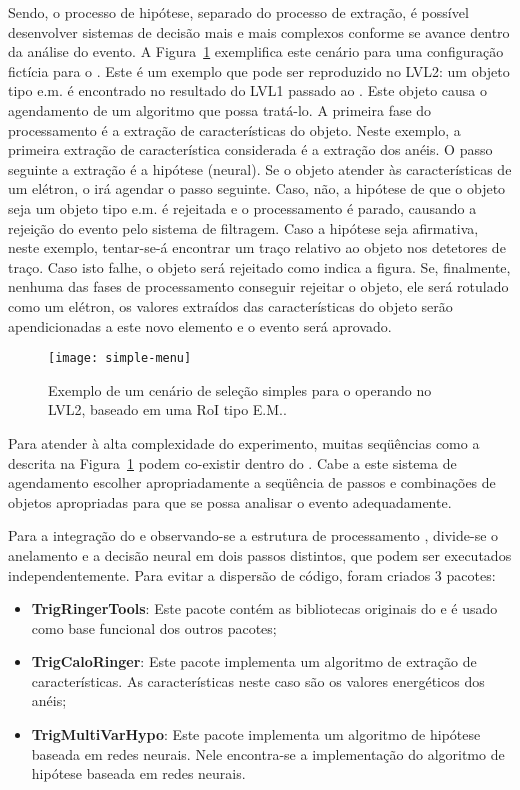 Sendo, o processo de hipótese, separado do processo de extração, é possível
desenvolver sistemas de decisão mais e mais complexos conforme se avance
dentro da análise do evento. A Figura~\ref{fig:simple-menu} exemplifica este
cenário para uma configuração fictícia para o . Este é um
exemplo que pode ser reproduzido no LVL2: um objeto tipo e.m. é encontrado no
resultado do LVL1 passado ao . Este objeto causa o agendamento
de um algoritmo que possa tratá-lo. A primeira fase do processamento é a
extração de características do objeto. Neste exemplo, a primeira extração de
característica considerada é a extração dos anéis. O passo seguinte a extração
é a hipótese (neural). Se o objeto atender às características de um elétron, o
 irá agendar o passo seguinte. Caso, não, a hipótese de que o
objeto seja um objeto tipo e.m. é rejeitada e o processamento é parado,
causando a rejeição do evento pelo sistema de filtragem. Caso a hipótese seja
afirmativa, neste exemplo, tentar-se-á encontrar um traço relativo ao objeto
nos detetores de traço. Caso isto falhe, o objeto será rejeitado como indica a
figura. Se, finalmente, nenhuma das fases de processamento conseguir rejeitar
o objeto, ele será rotulado como um elétron, os valores extraídos das
características do objeto serão apendicionadas a este novo elemento e o evento
será aprovado.

\begin{figure}
\begin{center}
\texttt{[image: simple-menu]}
\end{center}
\caption{Exemplo de um cenário de seleção simples para o 
operando no LVL2, baseado em uma RoI tipo E.M..}
\label{fig:simple-menu}
\end{figure}

Para atender à alta complexidade do experimento, muitas seqüências como a
descrita na Figura~\ref{fig:simple-menu} podem co-existir dentro do
. Cabe a este sistema de agendamento escolher apropriadamente
a seqüência de passos e combinações de objetos apropriadas para que se possa
analisar o evento adequadamente.

Para a integração do  e observando-se a estrutura de
processamento , divide-se o anelamento e a decisão neural em dois
passos distintos, que podem ser executados independentemente. Para evitar a
dispersão de código, foram criados 3 pacotes:

\begin{itemize}
\item \textbf{TrigRingerTools}: Este pacote contém as bibliotecas 
originais do  e é usado como base funcional dos outros
pacotes;
\item \textbf{TrigCaloRinger}: Este pacote implementa um algoritmo de 
extração de características. As características neste caso são os valores
energéticos dos anéis;
\item \textbf{TrigMultiVarHypo}: Este pacote implementa um algoritmo de
hipótese baseada em redes neurais. Nele encontra-se a implementação do
algoritmo de hipótese baseada em redes neurais. 
\end{itemize}

